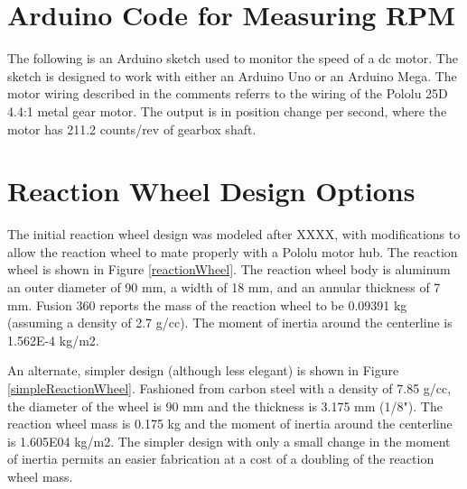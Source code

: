 \documentclass[12pt,letterpaper]{article}
\begin{document}
\begin{appendices}
\section{Arduino Code for Measuring RPM}

The following is an Arduino sketch used to monitor the speed of a dc motor.  The sketch is designed
to work with either an Arduino Uno or an Arduino Mega. The motor wiring described in the comments
referrs to the wiring of the Pololu 25D 4.4:1 metal gear motor.  The output is in position change 
per second, where the motor has 211.2 counts/rev of gearbox shaft. \\



\section{Reaction Wheel Design Options}

The initial reaction wheel design was modeled after XXXX, with modifications to allow the reaction wheel
to mate properly with a Pololu motor hub.  The reaction wheel is shown in Figure \ref{reactionWheel}.
The reaction wheel body is aluminum an outer diameter of 90 mm, a width of 18 mm, and an annular thickness of 7 mm. 
Fusion 360 reports the mass of the reaction wheel to be 0.09391 kg (assuming a density of 2.7 g/cc).
The moment of inertia around the centerline is 1.562E-4 kg/m2.

An alternate, simpler design (although less elegant) is shown in Figure \ref{simpleReactionWheel}.
Fashioned from carbon steel with a density of  7.85 g/cc, the diameter of the wheel is 90 mm and the
thickness is 3.175 mm (1/8").  The reaction wheel mass is 0.175 kg and the moment of inertia 
around the centerline is 1.605E04 kg/m2.  The simpler design with only a small change in the moment
of inertia permits an easier fabrication at a cost of a doubling of the reaction wheel mass.





\end{appendices}
\end{document}
